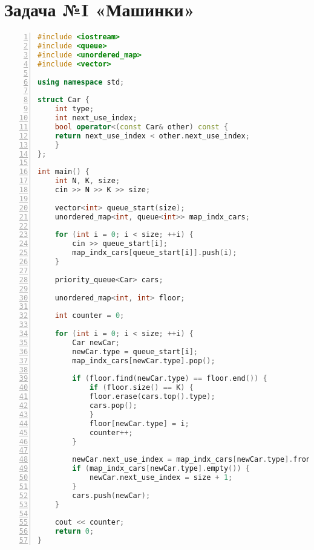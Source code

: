 \documentclass{article}
\begin{document}
\section{Задача №I «Машинки»}
\begin{lstlisting}[language=C++, frame=single, basicstyle=\ttfamily, numbers=left, numberstyle=\tiny]
#include <iostream>
#include <queue>
#include <unordered_map>
#include <vector>

using namespace std;

struct Car {
    int type;
    int next_use_index;
    bool operator<(const Car& other) const {
    return next_use_index < other.next_use_index;
    }
};

int main() {
    int N, K, size;
    cin >> N >> K >> size;

    vector<int> queue_start(size); 
    unordered_map<int, queue<int>> map_indx_cars; 
                                                
    for (int i = 0; i < size; ++i) {
        cin >> queue_start[i];
        map_indx_cars[queue_start[i]].push(i);
    }

    priority_queue<Car> cars;  
                                
    unordered_map<int, int> floor; 

    int counter = 0;

    for (int i = 0; i < size; ++i) {
        Car newCar;
        newCar.type = queue_start[i];
        map_indx_cars[newCar.type].pop();

        if (floor.find(newCar.type) == floor.end()) {
            if (floor.size() == K) {
            floor.erase(cars.top().type);
            cars.pop();
            }
            floor[newCar.type] = i;
            counter++;
        }

        newCar.next_use_index = map_indx_cars[newCar.type].front();
        if (map_indx_cars[newCar.type].empty()) {
            newCar.next_use_index = size + 1;
        }
        cars.push(newCar);
    }

    cout << counter;
    return 0;
}
\end{lstlisting}
\end{document}
